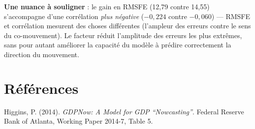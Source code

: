 \documentclass[11pt,a4paper]{article}
\begin{document}
\begin{alertebox}
\textbf{Une nuance à souligner} : le gain en RMSFE (12,79 contre 14,55) s'accompagne d'une corrélation \emph{plus négative} ($-0{,}224$ contre $-0{,}060$) --- RMSFE et corrélation mesurent des choses différentes (l'ampleur des erreurs contre le sens du co-mouvement). Le facteur réduit l'amplitude des erreurs les plus extrêmes, sans pour autant améliorer la capacité du modèle à prédire correctement la direction du mouvement.
\end{alertebox}

\section*{Références}
\begin{enumerate}[leftmargin=1.6em, label=\textbf{[\arabic*]}]
\item \hypertarget{ref1}{} Higgins, P. (2014). \textit{GDPNow: A Model for GDP ``Nowcasting''}. Federal Reserve Bank of Atlanta, Working Paper 2014-7, Table 5.
\end{enumerate}
\end{document}
